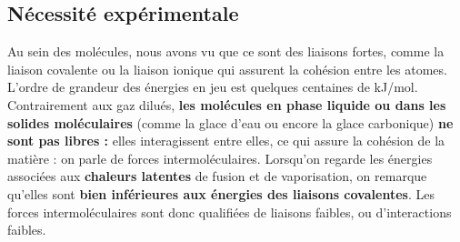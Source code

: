 \documentclass[11pt,a4paper]{report}
\begin{document}
\subsection{Nécessité expérimentale}

Au sein des molécules, nous avons vu que ce sont des liaisons fortes, comme la liaison covalente ou la liaison ionique qui assurent la cohésion entre les atomes. L'ordre de grandeur des énergies en jeu est quelques centaines de kJ/mol.\\

Contrairement aux gaz dilués, \textbf{les molécules en phase liquide ou dans les solides moléculaires} (comme la glace d'eau ou encore la glace carbonique) \textbf{ne sont pas libres :} elles interagissent entre elles, ce qui assure la cohésion de la matière : on parle de forces intermoléculaires. Lorsqu'on regarde les énergies associées aux \textbf{chaleurs latentes} de fusion et de vaporisation, on remarque qu'elles sont \textbf{bien inférieures aux énergies des liaisons covalentes}. Les forces intermoléculaires sont donc qualifiées de liaisons faibles, ou d'interactions faibles.
\end{document}
